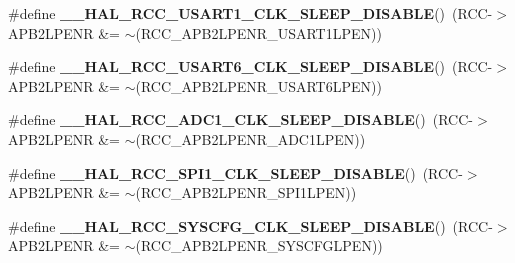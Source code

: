 \begin{DoxyCompactItemize}
\item 
\mbox{\label{group___r_c_c___a_p_b2___low_power___enable___disable_ga75ec6abe2e15eaa24893a8cc83f4cb50}} 
\#define {\bfseries \+\_\+\+\_\+\+H\+A\+L\+\_\+\+R\+C\+C\+\_\+\+U\+S\+A\+R\+T1\+\_\+\+C\+L\+K\+\_\+\+S\+L\+E\+E\+P\+\_\+\+D\+I\+S\+A\+B\+LE}()~(R\+CC-\/$>$A\+P\+B2\+L\+P\+E\+NR \&= $\sim$(R\+C\+C\+\_\+\+A\+P\+B2\+L\+P\+E\+N\+R\+\_\+\+U\+S\+A\+R\+T1\+L\+P\+EN))
\item 
\mbox{\label{group___r_c_c___a_p_b2___low_power___enable___disable_ga7df7a1b0a2e5d8b9318cf68de7665b3b}} 
\#define {\bfseries \+\_\+\+\_\+\+H\+A\+L\+\_\+\+R\+C\+C\+\_\+\+U\+S\+A\+R\+T6\+\_\+\+C\+L\+K\+\_\+\+S\+L\+E\+E\+P\+\_\+\+D\+I\+S\+A\+B\+LE}()~(R\+CC-\/$>$A\+P\+B2\+L\+P\+E\+NR \&= $\sim$(R\+C\+C\+\_\+\+A\+P\+B2\+L\+P\+E\+N\+R\+\_\+\+U\+S\+A\+R\+T6\+L\+P\+EN))
\item 
\mbox{\label{group___r_c_c___a_p_b2___low_power___enable___disable_ga9534ddc24145ef6335d76b35632b7fe2}} 
\#define {\bfseries \+\_\+\+\_\+\+H\+A\+L\+\_\+\+R\+C\+C\+\_\+\+A\+D\+C1\+\_\+\+C\+L\+K\+\_\+\+S\+L\+E\+E\+P\+\_\+\+D\+I\+S\+A\+B\+LE}()~(R\+CC-\/$>$A\+P\+B2\+L\+P\+E\+NR \&= $\sim$(R\+C\+C\+\_\+\+A\+P\+B2\+L\+P\+E\+N\+R\+\_\+\+A\+D\+C1\+L\+P\+EN))
\item 
\mbox{\label{group___r_c_c___a_p_b2___low_power___enable___disable_ga2abe90eeb15890f45e28e8926bf70838}} 
\#define {\bfseries \+\_\+\+\_\+\+H\+A\+L\+\_\+\+R\+C\+C\+\_\+\+S\+P\+I1\+\_\+\+C\+L\+K\+\_\+\+S\+L\+E\+E\+P\+\_\+\+D\+I\+S\+A\+B\+LE}()~(R\+CC-\/$>$A\+P\+B2\+L\+P\+E\+NR \&= $\sim$(R\+C\+C\+\_\+\+A\+P\+B2\+L\+P\+E\+N\+R\+\_\+\+S\+P\+I1\+L\+P\+EN))
\item 
\mbox{\label{group___r_c_c___a_p_b2___low_power___enable___disable_ga04863ff5c2174552387c549f0410df43}} 
\#define {\bfseries \+\_\+\+\_\+\+H\+A\+L\+\_\+\+R\+C\+C\+\_\+\+S\+Y\+S\+C\+F\+G\+\_\+\+C\+L\+K\+\_\+\+S\+L\+E\+E\+P\+\_\+\+D\+I\+S\+A\+B\+LE}()~(R\+CC-\/$>$A\+P\+B2\+L\+P\+E\+NR \&= $\sim$(R\+C\+C\+\_\+\+A\+P\+B2\+L\+P\+E\+N\+R\+\_\+\+S\+Y\+S\+C\+F\+G\+L\+P\+EN))
\item 

\end{DoxyCompactItemize}
